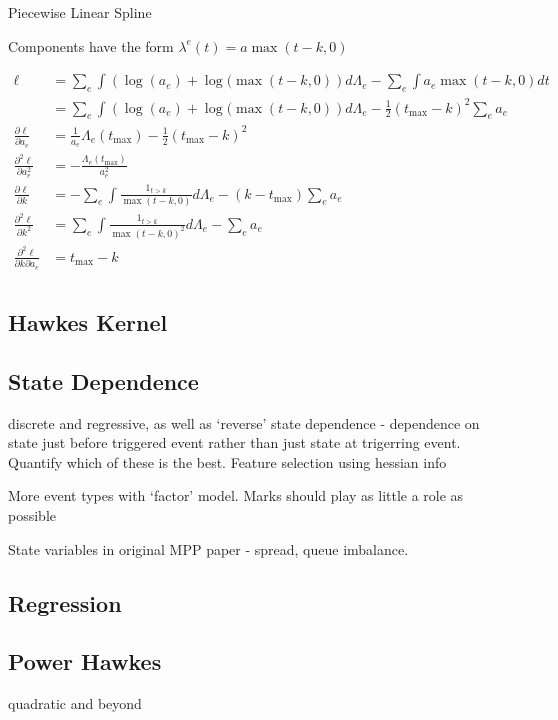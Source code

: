 \documentclass[honours,12pt]{unswthesis}
\numberwithin{equation}{section}
\begin{document}
Piecewise Linear Spline

Components have the form $\lambda^e(t) = a\max(t-k,0)$

\begin{equation*}
	\begin{align}
		\ell &= \sum_e \int \left(\log(a_e) + \log(\max(t-k,0)\right) d\Lambda_e - \sum_e \int a_e\max(t-k,0) dt \\
			&= \sum_e \int \left(\log(a_e) + \log(\max(t-k,0)\right) d\Lambda_e - \frac{1}{2}(t_\mathrm{max} -k)^2\sum_e a_e \\
		\frac{\partial\ell}{\partial a_e} &= \frac{1}{a_e} \Lambda_e(t_\mathrm{max}) - \frac{1}{2}(t_\mathrm{max}-k)^2\\ 
		\frac{\partial^2 \ell}{\partial a_e ^2} &= -\frac{\Lambda_e(t_\mathrm{max})}{a_e^2}\\
		\frac{\partial\ell}{\partial k} &= -\sum_e \int \frac{1_{t>k}}{\max(t-k,0)} d\Lambda_e - (k-t_\mathrm{max})\sum_e a_e \\
		\frac{\partial^2\ell}{\partial k^2} &= \sum_e \int \frac{1_{t>k}}{\max(t-k,0)^2} d\Lambda_e - \sum_e a_e \\
		\frac{\partial^2\ell}{\partial k\partial a_e} &= t_\mathrm{max}-k\\
	\end{align}
\end{equation*}

\subsection{Hawkes Kernel}
\subsection{State Dependence}
discrete and regressive, as well as `reverse' state dependence - dependence on state just before triggered event rather than just state at trigerring event. Quantify which of these is the best. Feature selection using hessian info

More event types with `factor' model. Marks should play as little a role as possible

State variables in original MPP paper - spread, queue imbalance.
\subsection{Regression}

\subsection{Power Hawkes}
quadratic and beyond
\end{document}
